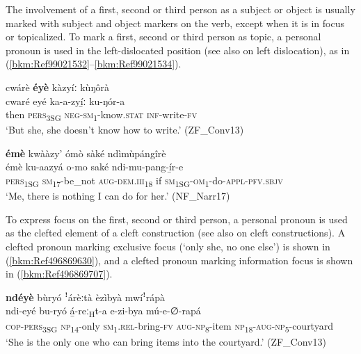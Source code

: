 The involvement of a first, second or third person as a subject or object is usually marked with subject and object markers on the verb, except when it is in focus or topicalized. To mark a first, second or third person as topic, a personal pronoun is used in the left-dislocated position (see also  on left dislocation), as in (\ref{bkm:Ref99021532}--\ref{bkm:Ref99021534}).

\ea
\label{bkm:Ref99021532}
cwárè \textbf{éyè} kàzyíː kùŋôrà\\
\gll cwaré  eyé    ka-a-zyí̲ː      ku-ŋór-a\\
then  \textsc{pers}\textsubscript{3SG}  \textsc{neg}-\textsc{sm}\textsubscript{1}-know.\textsc{stat}  \textsc{inf}-write-\textsc{fv}\\
\glt ‘But she, she doesn’t know how to write.’ (ZF\_Conv13)
\z

\ea
\label{bkm:Ref99021534}
\textbf{émè} kwààzy’ ómò sàké ndìmùpángîrè\\
\gll émè    ku-aazyá o-mo      saké  ndi-mu-pang-í̲r-e\\
\textsc{pers}\textsubscript{1SG}  \textsc{sm}\textsubscript{17}-be\_not 
\textsc{aug}-\textsc{dem}.\textsc{iii}\textsubscript{18}  if  \textsc{sm}\textsubscript{1SG}-\textsc{om}\textsubscript{1}-do-\textsc{appl}-\textsc{pfv}.\textsc{sbjv}\\
\glt ‘Me, there is nothing I can do for her.’ (NF\_Narr17)
\z

To express focus on the first, second or third person, a personal pronoun is used as the clefted element of a cleft construction (see also  on cleft constructions). A clefted pronoun marking exclusive focus (‘only she, no one else’) is shown in (\ref{bkm:Ref496869630}), and a clefted pronoun marking information focus is shown in (\ref{bkm:Ref496869707}).

\ea
\label{bkm:Ref496869630}
\textbf{ndéyè} bùryó ꜝárèːtà èzìbyà mwíꜝrápà\\
\gll ndi-eyé  bu-ryó  á̲-reː\textsubscript{H}t-a e-zi-bya    mú-e-∅-rapá \\
\textsc{cop}-\textsc{pers}\textsubscript{3SG}  \textsc{np}\textsubscript{14}-only  \textsc{sm}\textsubscript{1}.\textsc{rel}-bring-\textsc{fv}
\textsc{aug}-\textsc{np}\textsubscript{8}-item  \textsc{np}\textsubscript{18}-\textsc{aug}-\textsc{np}\textsubscript{5}-courtyard\\
\glt ‘She is the only one who can bring items into the courtyard.’ (ZF\_Conv13)
\z

